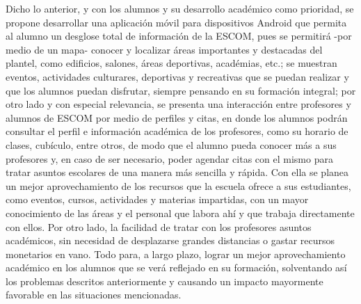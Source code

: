 Dicho lo anterior, y con los alumnos y su desarrollo académico como prioridad, se propone desarrollar una aplicación móvil para dispositivos Android que permita al alumno un desglose total de información de la ESCOM, pues se permitirá -por medio de un mapa- conocer y localizar áreas importantes y destacadas del plantel, como edificios, salones, áreas deportivas, académias, etc.; se muestran eventos, actividades culturares, deportivas y recreativas que se puedan realizar y que los alumnos puedan disfrutar, siempre pensando en su formación integral; por otro lado y con especial relevancia, se presenta una interacción entre profesores y alumnos de ESCOM por medio de perfiles y citas, en donde los alumnos podrán consultar el perfil e información académica de los profesores, como su horario de clases, cubículo, entre otros, de modo que el alumno pueda conocer más a sus profesores y, en caso de ser necesario, poder agendar citas con el mismo para tratar asuntos escolares de una manera más sencilla y rápida. 
Con ella se planea un mejor aprovechamiento de los recursos que la escuela ofrece a sus estudiantes, como eventos, cursos, actividades y materias impartidas, con un mayor conocimiento de las áreas y el personal que labora ahí y que trabaja directamente con ellos. Por otro lado, la facilidad de tratar con los profesores asuntos académicos, sin necesidad de desplazarse grandes distancias o gastar recursos monetarios en vano. Todo para, a largo plazo, lograr un mejor aprovechamiento académico en los alumnos que se verá reflejado en su formación, solventando así los problemas descritos anteriormente y causando un impacto mayormente favorable en las situaciones mencionadas. 



